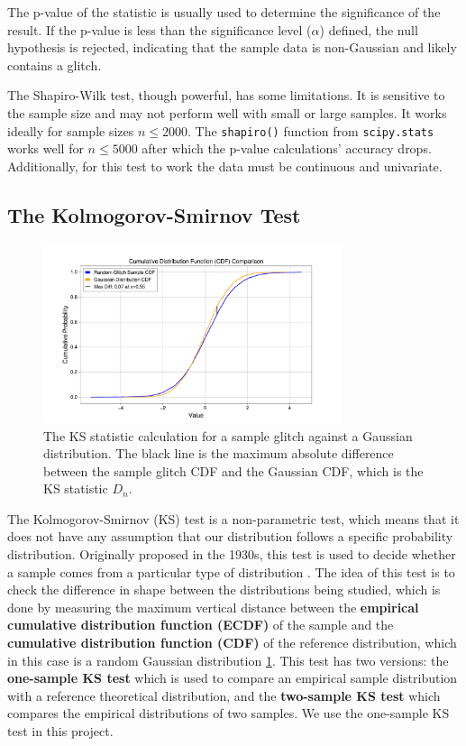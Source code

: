 \documentclass[12pt]{article}
\begin{document}
\medskip
\noindent The p-value of the statistic is usually used to determine the significance of the result. If the p-value is less than the significance level ($\alpha$) defined, the null hypothesis is rejected, indicating that the sample data is non-Gaussian and likely contains a glitch.

\medskip
\noindent The Shapiro-Wilk test, though powerful, has some limitations. It is sensitive to the sample size and may not perform well with small or large samples. It works ideally for sample sizes $n \leq 2000$. The \texttt{shapiro()} function from \texttt{scipy.stats} works well for $n \leq 5000$ after which the p-value calculations' accuracy drops. Additionally, for this test to work the data must be continuous and univariate.

\subsection{The Kolmogorov-Smirnov Test}\label{KolmogorovSmirnov}

\begin{figure}[H]
    \centering
    \includegraphics[width=0.78\textwidth]{images/cdf_comparison_glitch_gaussian.pdf}
    \caption{The KS statistic calculation for a sample glitch against a Gaussian distribution. The black line is the maximum absolute difference between the sample glitch CDF and the Gaussian CDF, which is the KS statistic $D_n$.}
    \label{fig:ecdf_cdf_comparison}
\end{figure}

\noindent The Kolmogorov-Smirnov (KS) test is a non-parametric test, which means that it does not have any assumption that our distribution follows a specific probability distribution. Originally proposed in the 1930s, this test is used to decide whether a sample comes from a particular type of distribution \cite{Kolmogorov_1951, chakravarti1967}. The idea of this test is to check the difference in shape between the distributions being studied, which is done by measuring the maximum vertical distance between the \textbf{empirical cumulative distribution function (ECDF)} of the sample and the \textbf{cumulative distribution function (CDF)} of the reference distribution, which in this case is a random Gaussian distribution \ref{fig:ecdf_cdf_comparison}. This test has two versions: the \textbf{one-sample KS test} which is used to compare an empirical sample distribution with a reference theoretical distribution, and the \textbf{two-sample KS test} which compares the empirical distributions of two samples. We use the one-sample KS test in this project.
\end{document}
